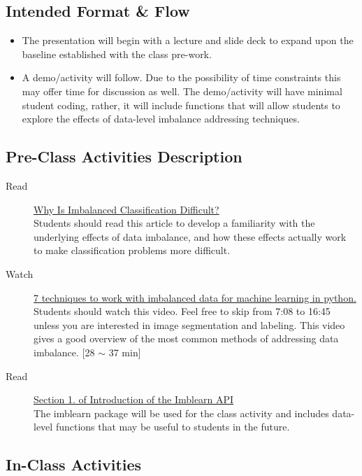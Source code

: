 \documentclass[12pt]{amsart}
\begin{document}
\subsection{Intended Format \& Flow}
\begin{itemize}
	\item The presentation will begin with a lecture and slide deck to expand upon the baseline established with the class pre-work.
	\item A demo/activity will follow. Due to the possibility of time constraints this may offer time for discussion as well.
		The demo/activity will have minimal student coding, rather, it will include functions that will allow students to
		explore the effects of data-level imbalance addressing techniques.
\end{itemize}

\subsection{Pre-Class Activities Description}
\begin{description}
	\item[Read] \href{https://machinelearningmastery.com/imbalanced-classification-is-hard/}{Why Is Imbalanced Classification Difficult?} \\
		Students should read this article to develop a familiarity with the underlying effects of data imbalance,
		and how these effects actually work to make classification problems more difficult.
	\item[Watch] \href{https://www.youtube.com/watch?v=vOBbKNwi6Go}{7 techniques to work with imbalanced data for machine learning in python.} \\
		Students should watch this video. Feel free to skip from 7:08 to 16:45 unless you are interested in image segmentation and labeling.
		This video gives a good overview of the most common methods of addressing data imbalance. [28 $\sim$ 37 min]
	\item[Read] \href{https://imbalanced-learn.org/stable/introduction.html}{Section 1. of Introduction of the Imblearn API} \\
		The imblearn package will be used for the class activity and includes data-level functions that may be useful to students in the future.
\end{description}

\subsection{In-Class Activities} \phantom{} \\
\end{document}
